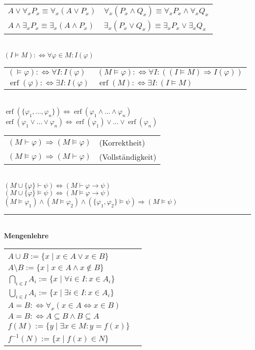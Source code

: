 \documentclass[a4paper,10pt,fleqn,twoside,twocolumn,dvipdfmx]{scrartcl}
\newcommand{\erf}{\operatorname{erf}}
\newcommand{\strong}[1]{\textsf{\textbf{#1}}}
\begin{document}
\noindent
\begin{tabular}{@{}l|l}
$A\lor\forall_{\!x} P_x \equiv \forall_{\!x}(A\lor P_x)$
&$\forall_{\!x}(P_x\land Q_x) \equiv \forall_{\!x}P_x\land\forall_{\!x}Q_x$\\
$A\land\exists_x P_x \equiv \exists_x(A\land P_x)$
&$\exists_{x}(P_x\lor Q_x) \equiv \exists_x P_x\lor\exists_x Q_x$
\end{tabular}\\
$(I\models M) :\Leftrightarrow \forall\varphi{\in}M\colon I(\varphi)$\\
\begin{tabular}{@{}l|l}
$(\models\varphi) :\Leftrightarrow \forall I\colon I(\varphi)$
& $(M\models\varphi) :\Leftrightarrow \forall I\colon ((I\models M)\Rightarrow I(\varphi))$\\
$\erf(\varphi) :\Leftrightarrow \exists I\colon I(\varphi)$
& $\erf(M) :\Leftrightarrow \exists I\colon (I\models M)$
\end{tabular}\\
$\erf(\{\varphi_1,\ldots,\varphi_n\}) \Leftrightarrow
\erf(\varphi_1\land\ldots\land\varphi_n)$\\
$\erf(\varphi_1\lor\ldots\lor\varphi_n) \Leftrightarrow
\erf(\varphi_1)\lor\ldots\lor\erf(\varphi_n)$\\
\begin{tabular}{@{}ll}
$(M\vdash\varphi)\Rightarrow (M\models\varphi)$ & (Korrektheit)\\
$(M\models\varphi)\Rightarrow (M\vdash\varphi)$ & (Vollständigkeit)
\end{tabular}\\
$(M\cup\{\varphi\}\vdash\psi)\Leftrightarrow (M\vdash \varphi\rightarrow\psi)$\\
$(M\cup\{\varphi\}\models\psi)\Leftrightarrow (M\models \varphi\rightarrow\psi)$\\
$(M\models\varphi_1)\land (M\models\varphi_2)\land (\{\varphi_1,\varphi_2\}\models\psi)
\Rightarrow (M\models\psi)$\\[-4pt]
\rule{\columnwidth}{\heavyrulewidth}\\
\strong{Mengenlehre}\\[2pt]
\begin{tabular}{@{}l@{\;\,}|@{\;\;}l}
\makecell[lt]{
$A\cap B := \{x\mid x\in A\land x\in B\}$\\
$A\cup B := \{x\mid x\in A\lor x\in B\}$\\
$A\setminus B := \{x\mid x\in A\land x\notin B\}$\\
$\bigcap_{i\in I} A_i := \{x\mid \forall i{\in}I\colon x{\in}A_i\}$\\
$\bigcup_{i\in I} A_i := \{x\mid \exists i{\in}I\colon x{\in}A_i\}$
}
&\makecell[lt]{
$A\subseteq B :\Leftrightarrow \forall_{\!x}(x\in A\Rightarrow x\in B)$\\
$A=B :\Leftrightarrow \forall_{\!x}(x\in A\Leftrightarrow x\in B)$\\
$A=B :\Leftrightarrow A\subseteq B\land B\subseteq A$\\
$f(M) := \{y\mid\exists x{\in}M\colon y{=}f(x)\}$\\
$f^{-1}(N) := \{x\mid f(x)\in N\}$
}
\end{tabular}\\
\end{document}
